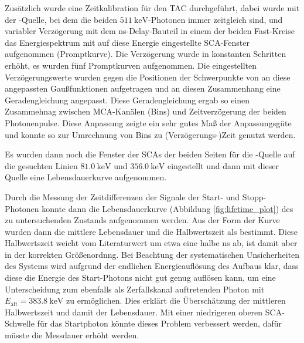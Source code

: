 Zusätzlich wurde eine Zeitkalibration für den TAC durchgeführt, dabei wurde mit der \na-Quelle, bei dem die beiden $\SI{511}{\kilo\eV}$-Photonen immer zeitgleich sind, und variabler Verzögerung mit dem ns-Delay-Bauteil in einem der beiden Fast-Kreise das Energiespektrum mit auf diese Energie eingestellte SCA-Fenster aufgenommen (Promptkurve). Die Verzögerung wurde in konstanten Schritten erhöht, es wurden fünf Promptkurven aufgenommen. Die eingestellten Verzögerungswerte wurden gegen die Positionen der Schwerpunkte von an diese angepassten Gaußfunktionen aufgetragen und an diesen Zusammenhang eine Geradengleichung angepasst. Diese Geradengleichung ergab so einen Zusammehnag zwischen MCA-Kanälen (Bins) und Zeitverzögerung der beiden Photonenpulse. Diese Anpassung zeigte ein sehr gutes Maß der Anpassungsgüte und konnte so zur Umrechnung von Bins zu (Verzögerungs-)Zeit genutzt werden.

Es wurden dann noch die Fenster der SCAs der beiden Seiten für die \ba-Quelle auf die gesuchten Linien $\SI{81.0}{\kilo\eV}$ und $\SI{356.0}{\kilo\eV}$ eingestellt und dann mit dieser Quelle eine Lebensdauerkurve aufgenommen.

Durch die Messung der Zeitdifferenzen der Signale der Start- und Stopp-Photonen konnte dann die Lebensdauerkurve (Abbildung \ref{fig:lifetime_plot}) des zu untersuchenden \caesium Zustands aufgenommen werden. Aus der Form der Kurve wurden dann die mittlere Lebensdauer und die Halbwertszeit als  bestimmt. Diese Halbwertszeit weicht vom Literaturwert um etwa eine halbe ns ab, ist damit aber in der korrekten Größenordnng. Bei Beachtung der systematischen Unsicherheiten des Systems wird aufgrund der endlichen Energieauflösung des Aufbaus klar, dass diese die Energie des Start-Photons nicht gut genug auflösen kann, um eine Unterscheidung zum ebenfalls als Zerfallskanal auftretenden Photon mit $E_\text{alt}=\SI{383.8}{\kilo\eV}$ zu ermöglichen. Dies erklärt die Überschätzung der mittleren Halbwertszeit und damit der Lebensdauer. Mit einer niedrigeren oberen SCA-Schwelle für das Startphoton könnte dieses Problem verbessert werden, dafür müsste die Messdauer erhöht werden.
